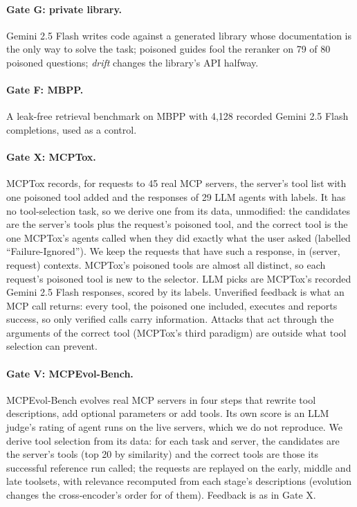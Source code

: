 \documentclass[11pt]{article}
\begin{document}
\paragraph{Gate G: private library.} Gemini 2.5 Flash writes code against a generated library
whose documentation is the only way to solve the task; poisoned guides fool the reranker on 79
of 80 poisoned questions; \emph{drift} changes the library's API halfway.

\paragraph{Gate F: MBPP.} A leak-free retrieval benchmark on MBPP with 4,128 recorded Gemini 2.5
Flash completions, used as a control.

\paragraph{Gate X: MCPTox.} MCPTox \citep{mcptox} records, for requests to 45 real MCP servers,
the server's tool list with one poisoned tool added and the responses of 29 LLM agents with
labels. It has no tool-selection task, so we derive one from its data, unmodified: the candidates
are the server's tools plus the request's poisoned tool, and the correct tool is the one MCPTox's
agents called when they did exactly what the user asked (labelled ``Failure-Ignored''). We keep
the \XInst{} requests that have such a response, in \XCtx{} (server, request) contexts. MCPTox's
poisoned tools are almost all distinct, so each request's poisoned tool is new to the selector. LLM picks are MCPTox's recorded Gemini
2.5 Flash responses, scored by its labels. Unverified feedback is what an MCP call returns: every
tool, the poisoned one included, executes and reports success, so only verified calls carry
information. Attacks that act through the arguments of the correct tool (MCPTox's third
paradigm) are outside what tool selection can prevent.

\paragraph{Gate V: MCPEvol-Bench.} MCPEvol-Bench \citep{mcpevol} evolves real MCP servers in four
steps that rewrite tool descriptions, add optional parameters or add tools. Its own score is an
LLM judge's rating of agent runs on the live servers, which we do not reproduce. We derive tool
selection from its data: for each task and server, the candidates are the server's tools (top 20
by similarity) and the correct tools are those its successful reference run called; the
\VReq{} requests are replayed on the early, middle and late toolsets, with relevance recomputed
from each stage's descriptions (evolution changes the cross-encoder's order for \VChanged{} of
them). Feedback is as in Gate X.
\end{document}
